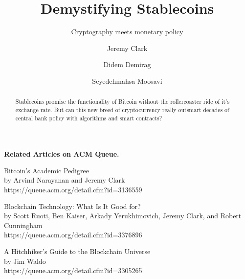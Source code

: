 \documentclass[acmlarge,screen]{acmart}
\begin{document}
\title{Demystifying Stablecoins}
\subtitle{Cryptography meets monetary policy}

\author{Jeremy Clark}

\author{Didem Demirag}

\author{Seyedehmahsa Moosavi}

\begin{abstract} Stablecoins promise the functionality of Bitcoin without the rollercoaster ride of it's exchange rate. But can this new breed of cryptocurrency really outsmart decades of central bank policy with algorithms and smart contracts?\end{abstract}

\maketitle









% 

\begin{Sidebar*}[h!]
\begin{framed}
\begin{flushleft}
\textbf{Related Articles on ACM Queue.} \newline

Bitcoin’s Academic Pedigree \\
by Arvind Narayanan and Jeremy Clark \\
https://queue.acm.org/detail.cfm?id=3136559 \newline

Blockchain Technology: What Is It Good for? \\ 
by Scott Ruoti, Ben Kaiser, Arkady Yerukhimovich, Jeremy Clark, and Robert Cunningham \\
https://queue.acm.org/detail.cfm?id=3376896 \newline

A Hitchhiker’s Guide to the Blockchain Universe\\
by Jim Waldo \\
https://queue.acm.org/detail.cfm?id=3305265
\end{flushleft}
\end{framed}
\end{Sidebar*}

\end{document}
